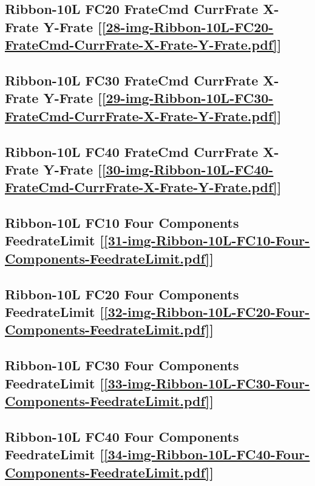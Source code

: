 \subsection       {Ribbon-10L FC20 FrateCmd CurrFrate X-Frate Y-Frate
	[\ref      {28-img-Ribbon-10L-FC20-FrateCmd-CurrFrate-X-Frate-Y-Frate.pdf}] }
\label{ssec-28-img-Ribbon-10L-FC20-FrateCmd-CurrFrate-X-Frate-Y-Frate.pdf}

\subsection       {Ribbon-10L FC30 FrateCmd CurrFrate X-Frate Y-Frate
	[\ref      {29-img-Ribbon-10L-FC30-FrateCmd-CurrFrate-X-Frate-Y-Frate.pdf}] }
\label{ssec-29-img-Ribbon-10L-FC30-FrateCmd-CurrFrate-X-Frate-Y-Frate.pdf}

\subsection       {Ribbon-10L FC40 FrateCmd CurrFrate X-Frate Y-Frate
	[\ref      {30-img-Ribbon-10L-FC40-FrateCmd-CurrFrate-X-Frate-Y-Frate.pdf}] }
\label{ssec-30-img-Ribbon-10L-FC40-FrateCmd-CurrFrate-X-Frate-Y-Frate.pdf}

\subsection       {Ribbon-10L FC10 Four Components FeedrateLimit
	[\ref      {31-img-Ribbon-10L-FC10-Four-Components-FeedrateLimit.pdf}] }
\label{ssec-31-img-Ribbon-10L-FC10-Four-Components-FeedrateLimit.pdf}

\subsection       {Ribbon-10L FC20 Four Components FeedrateLimit
	[\ref      {32-img-Ribbon-10L-FC20-Four-Components-FeedrateLimit.pdf}] }
\label{ssec-32-img-Ribbon-10L-FC20-Four-Components-FeedrateLimit.pdf}

\subsection       {Ribbon-10L FC30 Four Components FeedrateLimit
	[\ref      {33-img-Ribbon-10L-FC30-Four-Components-FeedrateLimit.pdf}] }
\label{ssec-33-img-Ribbon-10L-FC30-Four-Components-FeedrateLimit.pdf}

\subsection       {Ribbon-10L FC40 Four Components FeedrateLimit
	[\ref      {34-img-Ribbon-10L-FC40-Four-Components-FeedrateLimit.pdf}]}
\label{ssec-34-img-Ribbon-10L-FC40-Four-Components-FeedrateLimit.pdf}

